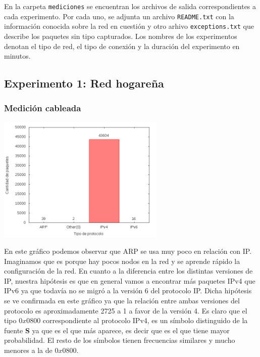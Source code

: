 En la carpeta \texttt{mediciones} se encuentran los archivos de salida correspondientes a cada
experimento. Por cada uno, se adjunta un archivo \texttt{README.txt} con la información conocida
sobre la red en cuestión y otro arhivo \texttt{exceptions.txt} que describe los paquetes sin tipo
capturados. Los nombres de los experimentos denotan el tipo de red, el tipo de conexión y la
duración del experimento en minutos.

\subsection{Experimento 1: Red hogareña}
\subsubsection{Medición cableada}

\begin{center}
\includegraphics[width=8cm]{../mediciones/home-eth-10/home-eth-10Protocolos.png}
\end{center}

En este gráfico podemos observar que ARP se usa muy poco en relación con IP. Imaginamos que es porque hay pocos nodos en la red y se aprende rápido la configuración de la red.
En cuanto a la diferencia entre los distintas versiones de IP, nuestra hipótesis es que en general vamos a encontrar más paquetes IPv4 que IPv6 ya que todavía no se migró a la versión 6 del protocolo IP.
Dicha hipótesis se ve confirmada en este gráfico ya que la relación entre ambas versiones del protocolo es aproximadamente 2725 a 1 a favor de la versión 4.
Es claro que el tipo $0x0800$ correspondiente al protocolo IPv4, es un símbolo distinguido de la fuente \textbf{S} ya que es el que más aparece,
es decir que es el que tiene mayor probabilidad. El resto de los símbolos tienen frecuencias similares y mucho menores a la de $0x0800$.

